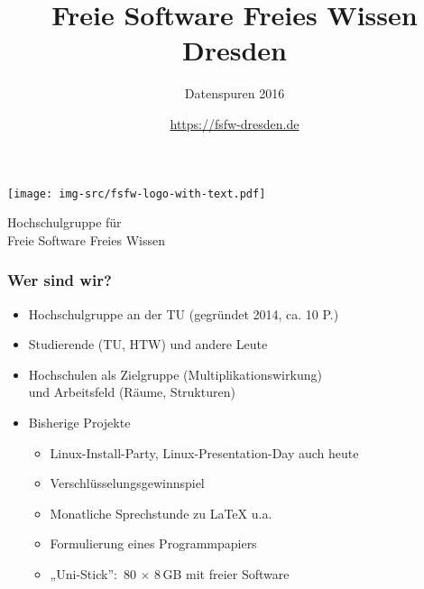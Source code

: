 \documentclass{beamer}
\title{Freie Software Freies Wissen Dresden}
\subtitle{Datenspuren 2016}
\author{\url{https://fsfw-dresden.de}}
\begin{document}
\begin{frame}
  \begin{center}%
    \texttt{[image: img-src/fsfw-logo-with-text.pdf]}\\

    \vspace*{-0.5\baselineskip}

    Hochschulgruppe für\\Freie Software Freies Wissen

    \vspace*{\baselineskip}

  \end{center}
\end{frame}

\begin{frame}[label=ct1]
  \frametitle{Wer sind wir?}

  \onslide<+->

  \begin{itemize}
  \item Hochschulgruppe an der TU (gegründet 2014, ca. 10 P.)
  \item Studierende (TU, HTW) und andere Leute
  \item Hochschulen als Zielgruppe (Multiplikationswirkung)\\
    und Arbeitsfeld (Räume, Strukturen)

    \bigskip\onslide<+->

  \item Bisherige Projekte
    \begin{itemize}
    \item Linux-Install-Party, Linux-Presentation-Day {\tiny auch heute}
    \item Verschlüsselungsgewinnspiel
    \item Monatliche Sprechstunde zu \LaTeX{} u.a.
    \item Formulierung eines Programmpapiers
    \item „Uni-Stick”:~80 $\times$ 8\,GB mit freier Software
    \end{itemize}
  \end{itemize}
\end{frame}
\end{document}
